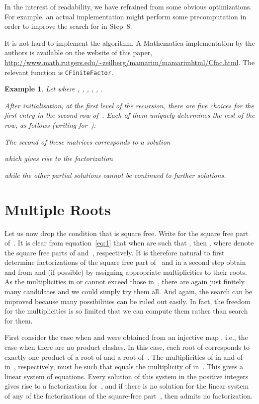 \documentclass{sig-alternate}
\newtheorem{example}[theorem]{Example}
\begin{document}
\medskip
In the interest of readability, we have refrained from some obvious optimizations.
For example, an actual implementation might perform some precomputation in order to
improve the search for  in Step~8.

It is not hard to implement the algorithm. A Mathematica implementation by the
authors is available on the website of this paper,
\url{http://www.math.rutgers.edu/~zeilberg/mamarim/mamarimhtml/Cfac.html}.  The
relevant function is \texttt{CFiniteFactor}.

\begin{example}
  Let  where
  , , , ,
  , .

  After initialisation, at the first level of the recursion, there are five choices
  for the first entry in the second row of~. Each of them uniquely determines the
  rest of the row, as follows (writing  for~):

  
  The second of these matrices corresponds to a solution
  
  which gives rise to the factorization
  
  while the other partial solutions cannot be continued to further solutions.   
\end{example}

\section{Multiple Roots}

Let us now drop the condition that  is square free. Write 
for the square free part of~. It is clear from equation~\eqref{eq:1} that
when  are such that , then , where  denote the square free parts of  and~,
respectively. It is therefore natural to first determine factorizations of the
square free part  of~ and in a second step obtain  and  from
 and  (if possible) by assigning appropriate multiplicities to
their roots. As the multiplicities in  or  cannot exceed those in~,
there are again just finitely many candidates and we could simply try them all.
And again, the search can be improved because many possibilities can be ruled
out easily. In fact, the freedom for the multiplicities is so limited that we
can compute them rather than search for them.

First consider the case when  and  were obtained from an injective
map , i.e., the case when there are no product clashes. In this case, each
root  of  corresponds to exactly one product 
of a root  of  and a root  of~. The
multiplicities  of  in  and  of  in~,
respectively, must be such that  equals the
multiplicity of  in~. This gives a linear system of equations.
Every solution of this system in the positive integers gives rise to a
factorization for~, and if there is no solution for the linear system of
any of the factorizations of the square-free part~, then  admits no factorization.
\end{document}
